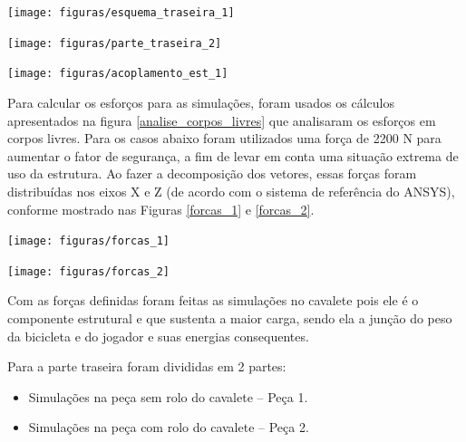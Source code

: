     \begin{center}
        \texttt{[image: figuras/esquema\_traseira\_1]}
        \label{esquema_traseira_1}
    \end{center}    

    \begin{center}
        \texttt{[image: figuras/parte\_traseira\_2]}
        \label{parte_traseira_2}
    \end{center}        
   
    \begin{center}
        \texttt{[image: figuras/acoplamento\_est\_1]}
        \label{acoplamento_est_1}
    \end{center}      
  
    Para calcular os esforços para as simulações, foram usados os cálculos apresentados na figura \ref{analise_corpos_livres} que analisaram os esforços em corpos livres. Para os casos abaixo foram utilizados uma força de 2200 N para aumentar o fator de segurança, a fim de levar em conta uma situação extrema de uso da estrutura. Ao fazer a decomposição dos vetores, essas forças foram distribuídas nos eixos X e Z (de acordo com o sistema de referência do ANSYS), conforme mostrado nas Figuras \ref{forcas_1} e \ref{forcas_2}.

    \begin{center}
        \texttt{[image: figuras/forcas\_1]}
        \label{forcas_1}
    \end{center}   
    
    \begin{center}
        \texttt{[image: figuras/forcas\_2]}
        \label{forcas_2}
    \end{center}  
 
    Com as forças definidas foram feitas as simulações no cavalete pois ele é o componente estrutural e que sustenta a maior carga, sendo ela a junção do peso da bicicleta e do jogador e suas energias consequentes.
 
    Para a parte traseira foram divididas em 2 partes:
    \begin{itemize}
        \item Simulações na peça sem rolo do cavalete – Peça 1.
        \item Simulações na peça com rolo do cavalete – Peça 2.
    \end{itemize}
 
